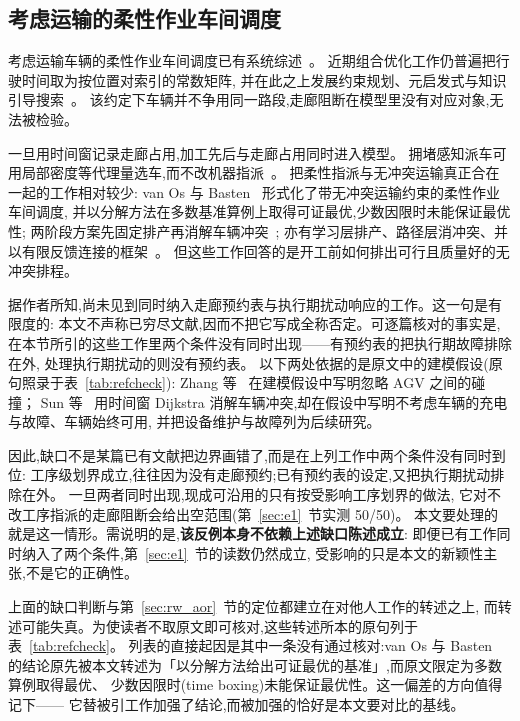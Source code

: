 \documentclass[manuscript,screen,review]{acmart}
\newcommand{\NPairs}{50}
\newcommand{\PassMiss}{\NPairs/\NPairs}      %
\begin{document}
\subsection{考虑运输的柔性作业车间调度}
\label{sec:rw_position}

考虑运输车辆的柔性作业车间调度已有系统综述~\cite{xin2025review}。
近期组合优化工作仍普遍把行驶时间取为按位置对索引的常数矩阵,
并在此之上发展约束规划、元启发式与知识引导搜索~\cite{meng2025cp,qin2026knowledge,fu2025integrated}。
该约定下车辆并不争用同一路段,走廊阻断在模型里没有对应对象,无法被检验。

一旦用时间窗记录走廊占用,加工先后与走廊占用同时进入模型。
拥堵感知派车可用局部密度等代理量选车,而不改机器指派~\cite{kim2026congestion}。
把柔性指派与无冲突运输真正合在一起的工作相对较少:
van Os 与 Basten~\cite{vanos2026exact} 形式化了带无冲突运输约束的柔性作业车间调度,
并以分解方法在多数基准算例上取得可证最优,少数因限时未能保证最优性;
两阶段方案先固定排产再消解车辆冲突~\cite{sun2023integrated};
亦有学习层排产、路径层消冲突、并以有限反馈连接的框架~\cite{li2026framework}。
但这些工作回答的是开工前如何排出可行且质量好的无冲突排程。

据作者所知,尚未见到同时纳入走廊预约表与执行期扰动响应的工作。这一句是有限度的:
本文不声称已穷尽文献,因而不把它写成全称否定。可逐篇核对的事实是,
在本节所引的这些工作里两个条件没有同时出现——有预约表的把执行期故障排除在外,
处理执行期扰动的则没有预约表。
以下两处依据的是原文中的建模假设(原句照录于表~\ref{tab:refcheck}):
Zhang 等~\cite{zhang2023energy} 在建模假设中写明忽略 AGV 之间的碰撞；
Sun 等~\cite{sun2023integrated}
用时间窗 Dijkstra 消解车辆冲突,却在假设中写明不考虑车辆的充电与故障、车辆始终可用,
并把设备维护与故障列为后续研究。

因此,缺口不是某篇已有文献把边界画错了,而是在上列工作中两个条件没有同时到位:
工序级划界成立,往往因为没有走廊预约;已有预约表的设定,又把执行期扰动排除在外。
一旦两者同时出现,现成可沿用的只有按受影响工序划界的做法,
它对不改工序指派的走廊阻断会给出空范围(第~\ref{sec:e1}~节实测 \PassMiss)。
本文要处理的就是这一情形。需说明的是,\textbf{该反例本身不依赖上述缺口陈述成立}:
即便已有工作同时纳入了两个条件,第~\ref{sec:e1}~节的读数仍然成立,
受影响的只是本文的新颖性主张,不是它的正确性。

上面的缺口判断与第~\ref{sec:rw_aor}~节的定位都建立在对他人工作的转述之上,
而转述可能失真。为使读者不取原文即可核对,这些转述所本的原句列于表~\ref{tab:refcheck}。
列表的直接起因是其中一条没有通过核对:van Os 与 Basten~\cite{vanos2026exact}
的结论原先被本文转述为「以分解方法给出可证最优的基准」,而原文限定为多数算例取得最优、
少数因限时(time boxing)未能保证最优性。这一偏差的方向值得记下——
它替被引工作加强了结论,而被加强的恰好是本文要对比的基线。
\end{document}

